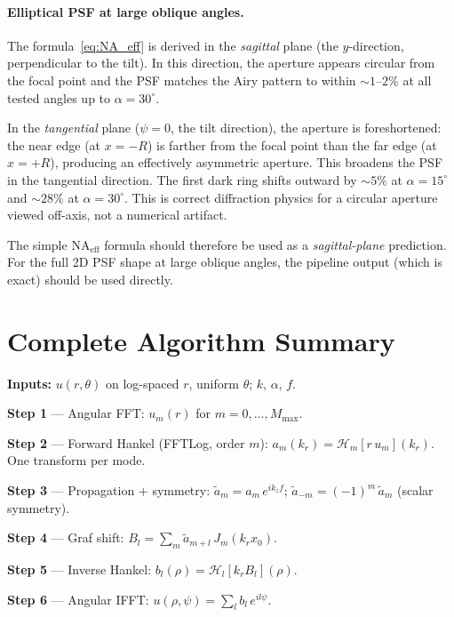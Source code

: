 \documentclass[11pt,a4paper]{article}
\newcommand{\HT}{\mathcal{H}}
\begin{document}
\paragraph{Elliptical PSF at large oblique angles.}
The formula~\eqref{eq:NA_eff} is derived in the \emph{sagittal} plane (the
$y$-direction, perpendicular to the tilt).  In this direction, the aperture
appears circular from the focal point and the PSF matches the Airy pattern to
within ${\sim}1$--$2\%$ at all tested angles up to $\alpha = 30^\circ$.

In the \emph{tangential} plane ($\psi = 0$, the tilt direction), the aperture
is foreshortened: the near edge (at $x = -R$) is farther from the focal point
than the far edge (at $x = +R$), producing an effectively asymmetric aperture.
This broadens the PSF in the tangential direction.  The first dark ring shifts
outward by ${\sim}5\%$ at $\alpha = 15^\circ$ and ${\sim}28\%$ at
$\alpha = 30^\circ$.  This is correct diffraction physics for a circular
aperture viewed off-axis, not a numerical artifact.

The simple $\mathrm{NA}_{\mathrm{eff}}$ formula should therefore be used as a
\emph{sagittal-plane} prediction.  For the full 2D PSF shape at large oblique
angles, the pipeline output (which is exact) should be used directly.


\section{Complete Algorithm Summary}

\begin{tcolorbox}[title=CyFFP: Scalar Standard Path]
\textbf{Inputs:} $u(r,\theta)$ on log-spaced $r$, uniform $\theta$;\;
$k$, $\alpha$, $f$.

\medskip
\textbf{Step 1} --- Angular FFT: $u_m(r)$ for $m = 0,\ldots,M_{\max}$.

\textbf{Step 2} --- Forward Hankel (FFTLog, order $m$):
$a_m(k_r) = \HT_m[r\,u_m](k_r)$.  One transform per mode.

\textbf{Step 3} --- Propagation + symmetry:
$\tilde a_m = a_m\,e^{ik_z f}$;\;
$\tilde a_{-m} = (-1)^m\,\tilde a_m$ (scalar symmetry).

\textbf{Step 4} --- Graf shift: $B_l = \sum_m \tilde a_{m+l}\,J_m(k_r x_0)$.

\textbf{Step 5} --- Inverse Hankel: $b_l(\rho) = \HT_l[k_r B_l](\rho)$.

\textbf{Step 6} --- Angular IFFT: $u(\rho,\psi) = \sum_l b_l\,e^{il\psi}$.
\end{tcolorbox}
\end{document}
